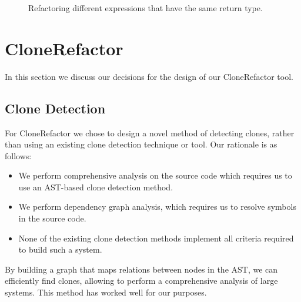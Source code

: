 \begin{figure}[H]
\begin{parcolumns}{2}
\end{parcolumns}
\caption{Refactoring different expressions that have the same return type.}
\label{fig:samereturn}
\end{figure}


\section{CloneRefactor}
In this section we discuss our decisions for the design of our CloneRefactor tool.

\subsection{Clone Detection}
For CloneRefactor we chose to design a novel method of detecting clones, rather than using an existing clone detection technique or tool. Our rationale is as follows:
\begin{itemize}
  \item We perform comprehensive analysis on the source code which requires us to use an AST-based clone detection method.
  \item We perform dependency graph analysis, which requires us to resolve symbols in the source code.
  \item None of the existing clone detection methods implement all criteria required to build such a system.
\end{itemize}
By building a graph that maps relations between nodes in the AST, we can efficiently find clones, allowing to perform a comprehensive analysis of large systems. This method has worked well for our purposes.

